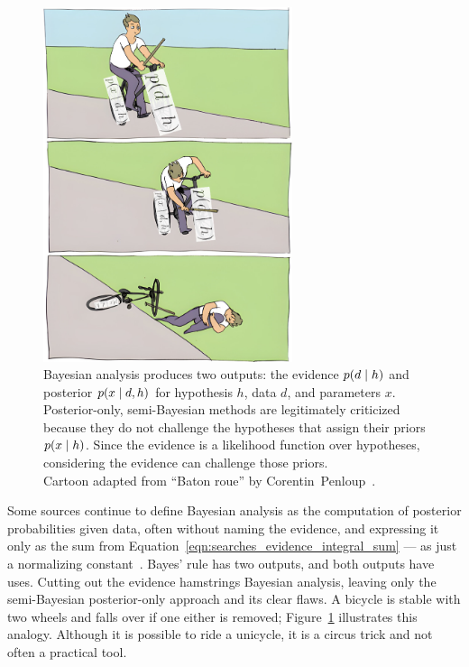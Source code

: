 \begin{figure}[tp]
\centering
\includegraphics[width=0.65\textwidth]{figures/searches_baton_roue_bayes.jpg}
\caption[
Bayesian analysis produces two outputs: the evidence and posterior
]{%
Bayesian analysis produces two outputs: the
evidence $p(d \mid h)$ and
posterior $p(x \mid d,h)$ for hypothesis $h$, data $d$, and parameters $x$.
Posterior-only, semi-Bayesian methods are legitimately criticized because they
do not challenge the hypotheses that assign their priors $p(x \mid h)$.
Since the evidence is a likelihood function over hypotheses, considering the
evidence can challenge those priors.
\\[0.5em]
Cartoon adapted from ``Baton roue'' by
Corentin~Penloup~\cite{penloup2011baton}.
}
\label{fig:searches_baton_roue_bayes}
\end{figure}

Some sources continue to define Bayesian analysis as the computation of
posterior probabilities given data, often without naming the evidence, and
expressing it only as the sum from
Equation~\ref{eqn:searches_evidence_integral_sum}
--- as just a normalizing constant~\cite{
Neyman1937Outline,
gelman1995bayesian,
gelman2008objections,
DAgostini:1994fjx,
DAgostini:2010hil,
cowan1998statistical,
pdg2022ynf
}.
Bayes' rule has two outputs, and both outputs have uses.
Cutting out the evidence hamstrings Bayesian analysis, leaving only the
semi-Bayesian posterior-only approach and its clear flaws.
A bicycle is stable with two wheels and falls over if one either
is removed;
Figure~\ref{fig:searches_baton_roue_bayes} illustrates this analogy.
Although it is possible to ride a unicycle, it is a circus trick and not often
a practical tool.

